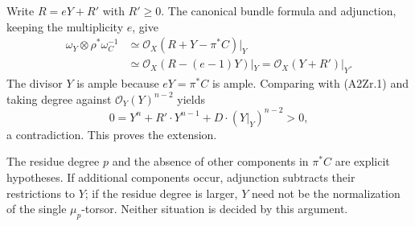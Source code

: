 Write $R=eY+R'$ with $R'\geq0$. The canonical bundle formula and
adjunction, keeping the multiplicity $e$, give
\begin{align*}
 \omega_Y\otimes\rho^*\omega_C^{-1}
 &\simeq\mathcal O_X(R+Y-\pi^*C)|_Y\\
 &\simeq\mathcal O_X(R-(e-1)Y)|_Y
  =\mathcal O_X(Y+R')|_Y.
\end{align*}
The divisor $Y$ is ample because $eY=\pi^*C$ is ample. Comparing
with (A2Zr.1) and taking degree against
$\mathcal O_Y(Y)^{n-2}$ yields
\[
 0=Y^n+R'\cdot Y^{n-1}+D\cdot(Y|_Y)^{n-2}>0,
\]
a contradiction. This proves the extension.

The residue degree $p$ and the absence of other components in
$\pi^*C$ are explicit hypotheses. If additional components occur,
adjunction subtracts their restrictions to $Y$; if the residue
degree is larger, $Y$ need not be the normalization of the single
$\mu_p$-torsor. Neither situation is decided by this argument.
